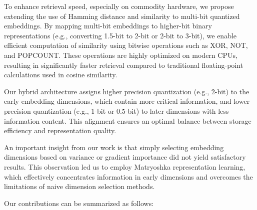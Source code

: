 \documentclass[acmtog, authorversion]{acmart}
\begin{document}
To enhance retrieval speed, especially on commodity hardware, we propose extending the use of Hamming distance and similarity to multi-bit quantized embeddings. By mapping multi-bit embeddings to higher-bit binary representations (e.g., converting 1.5-bit to 2-bit or 2-bit to 3-bit), we enable efficient computation of similarity using bitwise operations such as XOR, NOT, and POPCOUNT. These operations are highly optimized on modern CPUs, resulting in significantly faster retrieval compared to traditional floating-point calculations used in cosine similarity.  
  
Our hybrid architecture assigns higher precision quantization (e.g., 2-bit) to the early embedding dimensions, which contain more critical information, and lower precision quantization (e.g., 1-bit or 0.5-bit) to later dimensions with less information content. This alignment ensures an optimal balance between storage efficiency and representation quality.  
  
An important insight from our work is that simply selecting embedding dimensions based on variance or gradient importance did not yield satisfactory results. This observation led us to employ Matryoshka representation learning, which effectively concentrates information in early dimensions and overcomes the limitations of naive dimension selection methods.  
  
Our contributions can be summarized as follows:  
  
\end{document}
